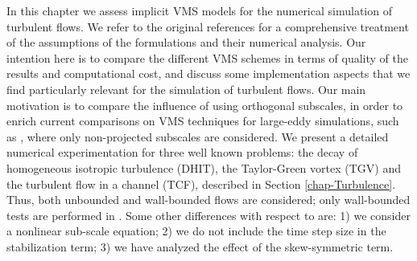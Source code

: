 
In this chapter we assess implicit VMS models for the numerical simulation of turbulent flows. We refer to the original references for a comprehensive treatment of the assumptions of the formulations and their numerical analysis. Our intention here is to compare the different VMS schemes in terms of quality of the results and computational cost, and discuss some implementation aspects that we find particularly relevant for the simulation of turbulent flows. Our main motivation is to compare the influence of using orthogonal subscales, in order to enrich current comparisons on VMS techniques for large-eddy simulations, such as \cite{gamnitzer_time-dependent_2010}, where only non-projected subscales are considered. We present a detailed numerical experimentation for three well known problems: the decay of homogeneous isotropic turbulence (DHIT), the Taylor-Green vortex (TGV) and the turbulent flow in a channel (TCF), described in Section \ref{chap-Turbulence}. Thus, both unbounded and wall-bounded flows are considered; only wall-bounded tests are performed in \cite{gamnitzer_time-dependent_2010}. Some other differences with respect to \cite{gamnitzer_time-dependent_2010} are: 1) we consider a nonlinear sub-scale equation; 2) we do not include the time step size in the stabilization term; 3) we have analyzed the effect of the skew-symmetric term. 
 
